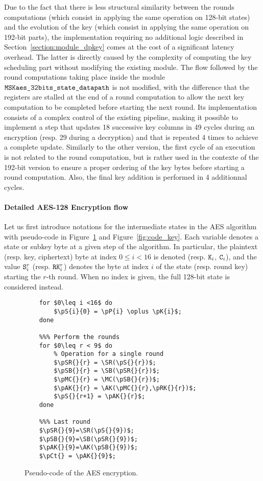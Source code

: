 \documentclass{scrartcl}
\begin{document}
Due to the fact that there is less structural similarity between the rounds
computations (which consist in applying the same operation on 128-bit states)
and the evolution of the key (which consist in applying the same operation on
192-bit parts), the implementation requiring no additional logic described in
Section~\ref{section:module_dpkey} comes at the cost of a significant latency
overhead. The latter is directly caused by the complexity of computing the key
scheduling part without modifying the existing module. The flow followed by the
round computations taking place inside the module $\texttt{MSKaes\_32bits\_state\_datapath}$ is not
modified, with the difference that the registers are stalled at the end of a
round computation to allow the next key computation to be completed before
starting the next round.  Its implementation consists of a complex control of
the existing pipeline, making it possible to implement a step that updates 18
successive key columns in 49 cycles during an encryption (resp. 29 during a
decryption) and that is repeated 4 times to achieve a complete update.
Similarly to the other version, the first cycle of an execution is not related
to the round computation, but is rather used in the contexte of the 192-bit
version to ensure a proper ordering of the key bytes before starting a round
computation. Also, the final key addition is performed in 4 additionnal cycles. 

\paragraph{Detailed AES-128 Encryption flow}
Let us first introduce notations for the intermediate states in the AES algorithm with
pseudo-code in Figure~\ref{fig:code_round} and Figure~\ref{fig:code_key}.
Each variable denotes a state or subkey byte at a given step of the algorithm.
In particular, the plaintext (resp. key, ciphertext) byte at index $0\leq i<16$
is denoted  (resp. $\texttt{K}_{i}$, $\texttt{C}_{i}$), and the value $\texttt{S}_{i}^{r}$ (resp.
$\texttt{RK}_{i}^{r}$) denotes the byte at index $i$ of the state (resp. round key)
starting the $r$-th round.
When no index is given, the full 128-bit state is considered instead.

\begin{figure}
    \begin{lstlisting}[frame=single]
    %%% First key addition
    for $0\leq i <16$ do
        $\pS{i}{0} = \pP{i} \oplus \pK{i}$;
    done
    
    %%% Perform the rounds
    for $0\leq r < 9$ do 
        % Operation for a single round
        $\pSR{}{r} = \SR(\pS{}{r})$;
        $\pSB{}{r} = \SB(\pSR{}{r})$;
        $\pMC{}{r} = \MC(\pSB{}{r})$;
        $\pAK{}{r} = \AK(\pMC{}{r},\pRK{}{r})$;
        $\pS{}{r+1} = \pAK{}{r}$;
    done
    
    %%% Last round
    $\pSR{}{9}=\SR(\pS{}{9})$;
    $\pSB{}{9}=\SB(\pSR{}{9})$;
    $\pAK{}{9}=\AK(\pSB{}{9})$;
    $\pCt{} = \pAK{}{9}$;
    \end{lstlisting}
    \caption{Pseudo-code of the AES encryption.}
    \label{fig:code_round}
\end{figure}
\end{document}
